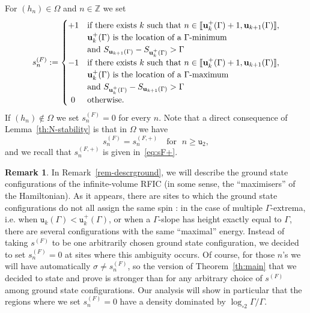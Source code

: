 \documentclass[10pt]{amsart}
\theoremstyle{definition}\newtheorem{defi}[theo]{Definition}\newtheorem{rema}[theo]{Remark}\newtheorem{exam}[theo]{Example}\newtheorem{exem}[theo]{Example}\newtheorem{nota}[theo]{Notation}
\newcommand{\bfu}{\mathbf{u}}
\newcommand{\bbZ}{\mathbb{Z}}
\newcommand{\gG}{\Gamma}
\newcommand{\gO}{\Omega}
\renewcommand*\ss{\mathtt{u}}
\newcommand{\tu}{\ss}
\newcommand{\loglog}{\log_{\circ 2}}
\newcommand{\llbracket}{\mathopen{[\mkern -2.7mu[}}
\newcommand{\rrbracket}{\mathclose{]\mkern -2.7mu]}}
\newcommand{\lbra}{\llbracket}
\newcommand{\rbra}{\rrbracket}
\begin{document}
For $(h_n) \in \gO$ and $n \in \bbZ$ we set
\begin{equation}\label{eq:sF}
s_n^{(F)}:=
\begin{cases}
+1 & \text{if there exists } k \text{ such that } n \in \lbra\bfu^+_k(\gG)+1, \bfu_{k+1}(\gG)\rbra,
\\ & \bfu^+_k(\gG) \text{ is the location of a }\gG\text{-minimum} \\
&\text{and } S_{ \bfu_{k+1}(\gG)}-S_{\bfu^+_k(\gG)}>\gG
\\
-1 & \text{if there exists } k \text{ such that } n \in \lbra\bfu^+_k(\gG)+1, \bfu_{k+1}(\gG)\rbra,
\\ & \bfu^+_k(\gG) \text{ is the location of a }\gG\text{-maximum}\\
&\text{and } S_{\bfu^+_k(\gG)}-S_{ \bfu_{k+1}(\gG)}>\gG
\\ \ 0 & \text{otherwise.}
\end{cases}
\end{equation}
If $(h_n) \not\in \gO$ we set $s_n^{(F)}=0$ for every $n$. Note that a direct consequence of Lemma~\ref{th:N-stability} is that in $\gO$ we have
\begin{equation}\label{eq:stability-+}
s_n^{(F)}= s_n^{(F,+)} \quad \text{for } \; n \ge \tu_2,
\end{equation}
and we recall that $s_n^{(F,+)}$ is given in~\eqref{eq:sF+}.


\begin{rema}\label{rem:defFisher}
In Remark~\ref{rem-descrground}, we will describe the ground state configurations of the infinite-volume RFIC (in some sense, the ``maximisers'' of the Hamiltonian). As it appears, there are sites to which the ground state configurations do not all assign the same spin : in the case of multiple $\gG$-extrema, i.e. when $\ss_k(\gG)<\ss_k^+(\gG)$, or when a $\gG$-slope has height exactly equal to $\gG$, there are several configurations with the same ``maximal'' energy. Instead of taking $ s^{(F)} $ to be one arbitrarily chosen ground state configuration, we decided to set $s_n^{(F)}= 0$ at sites where this ambiguity occurs. Of course, for those $n$'s we will have automatically $\sigma \neq s_n^{(F)}$, so the version of Theorem~\ref{th:main} that we decided to state and prove is stronger than for any arbitrary choice of $ s^{(F)} $ among ground state configurations. Our analysis will show in particular that the regions where we set $s_n^{(F)}=0$ have a density dominated by ${\loglog\gG}/ \gG$.
\end{rema}
\end{document}
